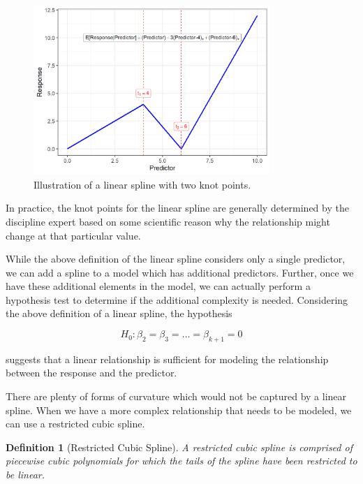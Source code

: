 \documentclass[
]{book}
\theoremstyle{plain}
\theoremstyle{mydefn}
\newtheorem{definition}{Definition}[chapter]
\theoremstyle{myexmpl}
\theoremstyle{remark}
\begin{document}
\begin{figure}

{\centering \includegraphics[width=0.8\textwidth]{./Images/glm-splines-linear-spline-1} 

}

\caption{Illustration of a linear spline with two knot points.}\label{fig:glm-splines-linear-spline}
\end{figure}

\begin{rmdtip}
In practice, the knot points for the linear spline are generally determined by the discipline expert based on some scientific reason why the relationship might change at that particular value.
\end{rmdtip}

While the above definition of the linear spline considers only a single predictor, we can add a spline to a model which has additional predictors. Further, once we have these additional elements in the model, we can actually perform a hypothesis test to determine if the additional complexity is needed. Considering the above definition of a linear spline, the hypothesis

\[H_0: \beta_2 = \beta_3 = \dotsc = \beta_{k+1} = 0\]

suggests that a linear relationship is sufficient for modeling the relationship between the response and the predictor.

There are plenty of forms of curvature which would not be captured by a linear spline. When we have a more complex relationship that needs to be modeled, we can use a restricted cubic spline.

\begin{definition}[Restricted Cubic Spline]
A restricted cubic spline is comprised of piecewise cubic polynomials for which the tails of the spline have been restricted to be linear.
\end{definition}
\end{document}

